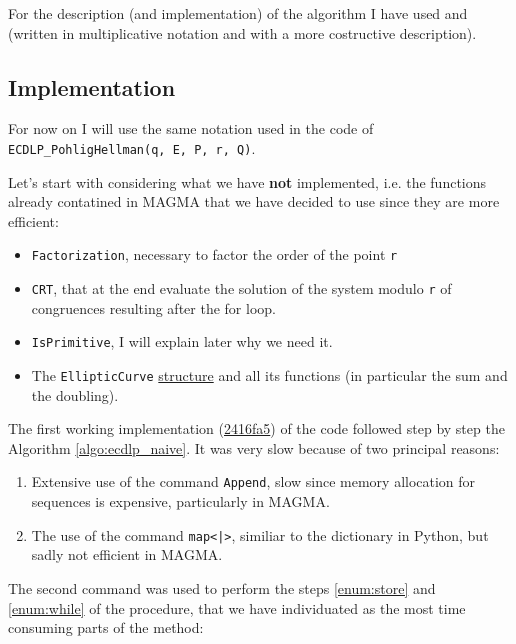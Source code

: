\documentclass{article}
\theoremstyle{plain}
\theoremstyle{remark}
\theoremstyle{definition}
\begin{document}
For the description (and implementation) of the algorithm I have used \linebreak
\cite[Section 5.2.3]{washington} and \cite[Section 7.2.3]{stinson} (written in multiplicative notation and with a more costructive description). 

\subsection{Implementation}

For now on I will use the same notation used in the code of\\ \texttt{ECDLP}\verb|_|\texttt{PohligHellman(q, E, P, r, Q)}.

Let's start with considering what we have \textbf{not} implemented, i.e. the functions already contatined in MAGMA that we have decided to use since they are more efficient:
\begin{itemize}
	\item \verb|Factorization|, necessary to factor the order of the point \verb|r|
	\item \verb|CRT|, that at the end evaluate the solution of the system modulo \verb|r| of congruences resulting after the for loop.
	\item \verb|IsPrimitive|, I will explain later why we need it.
	\item The \verb|EllipticCurve| \href{http://magma.maths.usyd.edu.au/magma/handbook/elliptic_curves}{structure} and all its functions (in particular the sum and the doubling). 
\end{itemize}

The first working implementation (\href{https://github.com/giacomoborin/project2_MAGMA/blob/2416fa58ca58ef91075fc4a52427d68a5fa182c1/ECDLP.mag}{2416fa5}) of the code followed step by step the Algorithm \ref{algo:ecdlp_naive}. It was very slow because of two principal reasons:
\begin{enumerate}
	\item \label{enum:append} Extensive use of the command \verb|Append|, slow since memory allocation for sequences is expensive, particularly in MAGMA.
	\item \label{enum:map} The use of the command \texttt{map<|>}, similiar to the dictionary in Python, but sadly not efficient in MAGMA. 
\end{enumerate}
The second command was used to perform the steps \ref{enum:store} and \ref{enum:while} of the procedure, that we have individuated as the most time consuming parts of the method:
\end{document}
